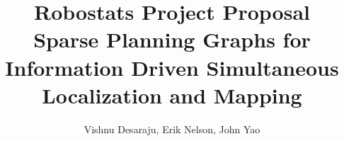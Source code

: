 \documentclass[]{article}
\begin{document}
\title{Robostats Project Proposal \\ Sparse Planning Graphs for Information Driven Simultaneous Localization and Mapping}
\author{Vishnu Desaraju, Erik Nelson, John Yao}

\maketitle






\end{document}
